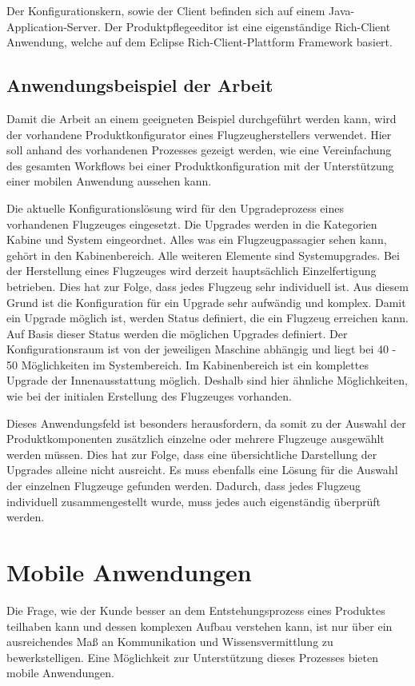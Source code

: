 Der Konfigurationskern, sowie der Client befinden sich auf einem Java-Application-Server. Der Produktpflegeeditor ist eine eigenständige Rich-Client Anwendung, welche auf dem Eclipse Rich-Client-Plattform Framework\cite{bib:eclipseRCP} basiert.

\subsection{Anwendungsbeispiel der Arbeit} \label{airbusConfigurator}
Damit die Arbeit an einem geeigneten Beispiel durchgeführt werden kann, wird der vorhandene Produktkonfigurator eines Flugzeugherstellers verwendet. Hier soll anhand des vorhandenen Prozesses gezeigt werden, wie eine Vereinfachung des gesamten Workflows bei einer Produktkonfiguration mit der Unterstützung einer mobilen Anwendung aussehen kann. \par 

Die aktuelle Konfigurationslösung wird für den Upgradeprozess eines vorhandenen Flugzeuges eingesetzt. Die Upgrades werden in die Kategorien Kabine und System eingeordnet. Alles was ein Flugzeugpassagier sehen kann, gehört in den Kabinenbereich. Alle weiteren Elemente sind Systemupgrades. Bei der Herstellung eines Flugzeuges wird derzeit hauptsächlich Einzelfertigung betrieben. Dies hat zur Folge, dass jedes Flugzeug sehr individuell ist. Aus diesem Grund ist die Konfiguration für ein Upgrade sehr aufwändig und komplex. Damit ein Upgrade möglich ist, werden Status definiert, die ein Flugzeug erreichen kann. Auf Basis dieser Status werden die möglichen Upgrades definiert. Der Konfigurationsraum ist von der jeweiligen Maschine abhängig und liegt bei 40 - 50 Möglichkeiten im Systembereich. Im Kabinenbereich ist ein komplettes Upgrade der Innenausstattung möglich. Deshalb sind hier ähnliche Möglichkeiten, wie bei der initialen Erstellung des Flugzeuges vorhanden.
\par


Dieses Anwendungsfeld ist besonders herausfordern, da somit zu der Auswahl der Produktkomponenten zusätzlich einzelne oder mehrere Flugzeuge ausgewählt werden müssen. Dies hat zur Folge, dass eine übersichtliche Darstellung der Upgrades alleine nicht ausreicht. Es muss ebenfalls eine Lösung für die Auswahl der einzelnen Flugzeuge gefunden werden.  Dadurch, dass jedes Flugzeug individuell zusammengestellt wurde, muss jedes auch eigenständig überprüft werden. 


\section{Mobile Anwendungen} \label{mobileAppsGrundlagen}
Die Frage, wie der Kunde besser an dem Entstehungsprozess eines Produktes teilhaben kann und dessen komplexen Aufbau verstehen kann, ist nur über ein ausreichendes Maß an Kommunikation und Wissensvermittlung zu bewerkstelligen. Eine Möglichkeit zur Unterstützung dieses Prozesses bieten mobile Anwendungen.\par

